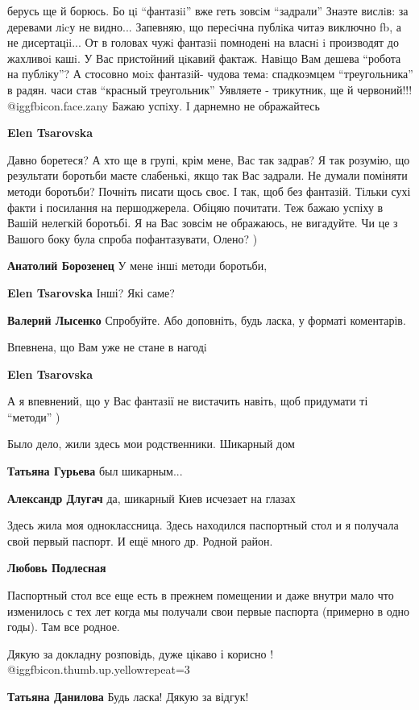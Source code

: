 \begin{itemize}
\begin{itemize}
\begin{itemize}
берусь ще й борюсь. Бо цi \enquote{фантазii} вже геть зовсiм \enquote{задрали}
Знаэте вислiв: за деревами лicу не видно... Запевняю, що пересiчна публiка
читаэ виключно fb, а не дисертацii... От в головах чужi фантазii помноденi на
власнi i производят до жахливоi кашi. У Вас пристойний цiкавий фактаж. Навiщо
Вам дешева \enquote{робота на публiку}? А стосовно моix фантазiй- чудова тема:
спадкоэмцем \enquote{треугольника} в радян. часи став \enquote{красный
треугольник} Уявляете - трикутник, ще й червоний!!! @igg{fbicon.face.zany} Бажаю успiху. I дарнемно
не ображайтесь

\textbf{Elen Tsarovska} 

Давно боретеся? А хто ще в групі, крім мене, Вас так задрав? Я так розумію, що
результати боротьби маєте слабенькі, якщо так Вас задрали. Не думали поміняти
методи боротьби? Почніть писати щось своє. І так, щоб без фантазій. Тільки сухі
факти і посилання на першоджерела. Обіцяю почитати. Теж бажаю успіху в Вашій
нелегкій боротьбі. Я на Вас зовсім не ображаюсь, не вигадуйте. Чи це з Вашого
боку була спроба пофантазувати, Олено? )


\textbf{Анатолий Борозенец} У мене iншi методи боротьби,

\textbf{Elen Tsarovska} Інші? Які саме?
\end{itemize} %

\textbf{Валерий Лысенко} Спробуйте. Або доповніть, будь ласка, у форматі коментарів.

Впевнена, що Вам уже не стане в нагодi

\textbf{Elen Tsarovska} 

А я впевнений, що у Вас фантазії не вистачить навіть, щоб придумати ті
\enquote{методи} )

\end{itemize} %

Было дело, жили здесь мои родственники. Шикарный дом

\begin{itemize} %
\textbf{Татьяна Гурьева} был шикарным...

\textbf{Александр Длугач} да, шикарный Киев исчезает на глазах
\end{itemize} %

Здесь жила моя одноклассница. Здесь находился паспортный стол и я получала свой
первый паспорт. И ещё много др. Родной район.

\textbf{Любовь Подлесная} 

Паспортный стол все еще есть в прежнем помещении и даже внутри мало что
изменилось с тех лет когда мы получали свои первые паспорта (примерно в одно
годы). Там все родное.


Дякую за докладну розповідь, дуже цікаво і корисно ! @igg{fbicon.thumb.up.yellow}{repeat=3} 

\textbf{Татьяна Данилова} Будь ласка! Дякую за відгук!

\end{itemize} %
